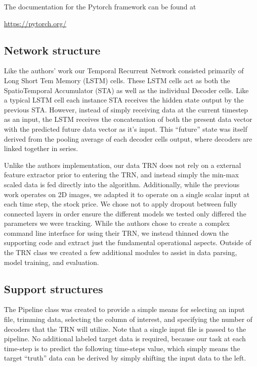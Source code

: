 \documentclass{article}
\begin{document}
    The documentation for the Pytorch framework can be found at
    \begin{center}
      \url{https://pytorch.org/}
    \end{center}
        
    \subsection{Network structure}
    Like the authors' work our Temporal Recurrent Network consisted primarily of Long Short Tem Memory (LSTM) cells. These LSTM cells act as both the SpatioTemporal Accumulator (STA) as well as the individual Decoder cells. Like a typical LSTM cell each instance STA receives the hidden state output by the previous STA. However, instead of simply receiving data at the current timestep as an input, the LSTM receives the concatenation of both the present data vector with the predicted future data vector as it’s input. This “future” state was itself derived from the pooling average of each decoder cells output, where decoders are linked together in series.
    
    Unlike the authors implementation, our data TRN does not rely on a external feature extractor prior to entering the TRN, and instead simply the min-max scaled data is fed directly into the algorithm. Additionally, while the previous work operates on 2D images, we adapted it to operate on a single scalar input at each time step, the stock price. We chose not to apply dropout between fully connected layers in order ensure the different models we tested only differed the parameters we were tracking.
    While the authors chose to create a complex command line interface for using their TRN, we instead thinned down the supporting code and extract just the fundamental operational aspects. Outside of the TRN class we created a few additional modules to assist in data parsing, model training, and evaluation.
    
    \subsection{Support structures}
    The Pipeline class was created to provide a simple means for selecting an input file, trimming data, selecting the column of interest, and specifying the number of decoders that the TRN will utilize. Note that a single input file is passed to the pipeline. No additional labeled target data is required, because our task at each time-step is to predict the following time-steps value, which simply means the target “truth” data can be derived by simply shifting the input data to the left.
    
\end{document}
